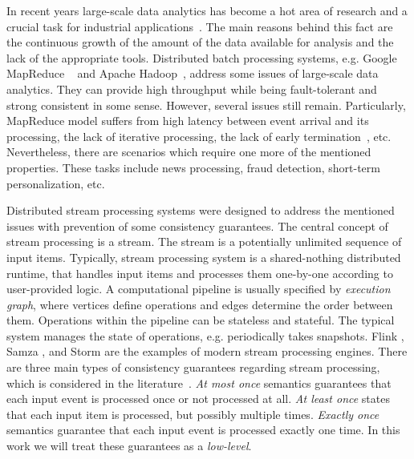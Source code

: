 
\label {fs-phd-intro}

In recent years large-scale data analytics has become a hot area of research and a crucial task for industrial applications~\cite{Zou:2010:SRQ:1920841.1921012}. The main reasons behind this fact are the continuous growth of the amount of the data available for analysis and the lack of the appropriate tools. Distributed batch processing systems, e.g. Google MapReduce ~\cite{Dean:2008:MSD:1327452.1327492} and Apache Hadoop~\cite{hadoop2009hadoop}, address some issues of large-scale data analytics. They can provide high throughput while being fault-tolerant and strong consistent in some sense. However, several issues still remain. Particularly, MapReduce model suffers from high latency between event arrival and its processing, the lack of iterative processing, the lack of early termination~\cite{Doulkeridis:2014:SLA:2628707.2628782}, etc. Nevertheless, there are scenarios which require one more of the mentioned properties. These tasks include news processing, fraud detection, short-term personalization, etc.

Distributed stream processing systems were designed to address the mentioned issues with prevention of some consistency guarantees. The central concept of stream processing is a stream. The stream is a potentially unlimited sequence of input items. Typically, stream processing system is a shared-nothing distributed runtime, that handles input items and processes them one-by-one according to user-provided logic. A computational pipeline is usually specified by {\em execution graph}, where vertices define operations and edges determine the order between them. Operations within the pipeline can be stateless and stateful. The typical system manages the state of operations, e.g. periodically takes snapshots. Flink \cite{carbone2015apache}, Samza \cite{Noghabi:2017:SSS:3137765.3137770}, and Storm \cite{apache:storm} are the examples of modern stream processing engines. There are three main types of consistency guarantees regarding stream processing, which is considered in the literature~\cite{Kulkarni:2015:THS:2723372.2742788, Akidau:2013:MFS:2536222.2536229, Carbone:2017:SMA:3137765.3137777}. {\em At most once} semantics guarantees that each input event is processed once or not processed at all. {\em At least once} states that each input item is processed, but possibly multiple times. {\em Exactly once} semantics guarantee that each input event is processed exactly one time. In this work we will treat these guarantees as a {\em low-level}. 

